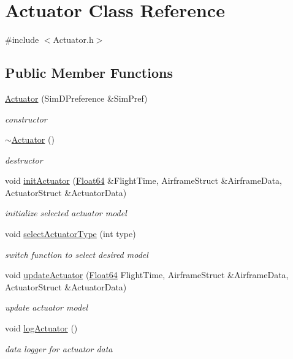 \hypertarget{class_actuator}{}\section{Actuator Class Reference}
\label{class_actuator}


{\ttfamily \#include $<$Actuator.\+h$>$}

\subsection*{Public Member Functions}
\begin{DoxyCompactItemize}
\item 
\hyperlink{class_actuator_a136af3d7d681d8c445e5d4ce552e4741}{Actuator} (Sim\+D\+Preference \&Sim\+Pref)
\begin{DoxyCompactList}\small\item\em constructor \end{DoxyCompactList}\item 
\hyperlink{class_actuator_a3c19e3031076395a918ab72e1acc8a3c}{$\sim$\+Actuator} ()
\begin{DoxyCompactList}\small\item\em destructor \end{DoxyCompactList}\item 
void \hyperlink{class_actuator_afb76ea4c70afd8dc6c8968be090ee4c5}{init\+Actuator} (\hyperlink{group___tools_ga3f1431cb9f76da10f59246d1d743dc2c}{Float64} \&Flight\+Time, Airframe\+Struct \&Airframe\+Data, Actuator\+Struct \&Actuator\+Data)
\begin{DoxyCompactList}\small\item\em initialize selected actuator model \end{DoxyCompactList}\item 
void \hyperlink{class_actuator_a9276e545f7378225f4efab89014a90a7}{select\+Actuator\+Type} (int type)
\begin{DoxyCompactList}\small\item\em switch function to select desired model \end{DoxyCompactList}\item 
void \hyperlink{class_actuator_a63aacfd84f07a1beb097b117b818c30f}{update\+Actuator} (\hyperlink{group___tools_ga3f1431cb9f76da10f59246d1d743dc2c}{Float64} Flight\+Time, Airframe\+Struct \&Airframe\+Data, Actuator\+Struct \&Actuator\+Data)
\begin{DoxyCompactList}\small\item\em update actuator model \end{DoxyCompactList}\item 
void \hyperlink{class_actuator_a0acfebd90c57b798d6b1136fade21347}{log\+Actuator} ()
\begin{DoxyCompactList}\small\item\em data logger for actuator data \end{DoxyCompactList}\end{DoxyCompactItemize}


